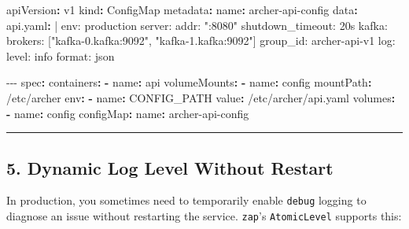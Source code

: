 \documentclass[
]{article}
\newenvironment{Shaded}{}{}
\newcommand{\AttributeTok}[1]{\textcolor[rgb]{0.49,0.56,0.16}{#1}}
\newcommand{\CharTok}[1]{\textcolor[rgb]{0.25,0.44,0.63}{#1}}
\newcommand{\FunctionTok}[1]{\textcolor[rgb]{0.02,0.16,0.49}{#1}}
\newcommand{\KeywordTok}[1]{\textcolor[rgb]{0.00,0.44,0.13}{\textbf{#1}}}
\newcommand{\NormalTok}[1]{#1}
\newcommand{\PreprocessorTok}[1]{\textcolor[rgb]{0.74,0.48,0.00}{#1}}
\begin{document}
\begin{Shaded}
\begin{Highlighting}[]
\FunctionTok{apiVersion}\KeywordTok{:}\AttributeTok{ v1}
\FunctionTok{kind}\KeywordTok{:}\AttributeTok{ ConfigMap}
\FunctionTok{metadata}\KeywordTok{:}
\AttributeTok{  }\FunctionTok{name}\KeywordTok{:}\AttributeTok{ archer{-}api{-}config}
\FunctionTok{data}\KeywordTok{:}
\FunctionTok{  api.yaml}\KeywordTok{: }\CharTok{|}
\NormalTok{    env: production}
\NormalTok{    server:}
\NormalTok{      addr: ":8080"}
\NormalTok{      shutdown\_timeout: 20s}
\NormalTok{    kafka:}
\NormalTok{      brokers: ["kafka{-}0.kafka:9092", "kafka{-}1.kafka:9092"]}
\NormalTok{      group\_id: archer{-}api{-}v1}
\NormalTok{    log:}
\NormalTok{      level: info}
\NormalTok{      format: json}

\PreprocessorTok{{-}{-}{-}}
\FunctionTok{spec}\KeywordTok{:}
\AttributeTok{  }\FunctionTok{containers}\KeywordTok{:}
\AttributeTok{  }\KeywordTok{{-}}\AttributeTok{ }\FunctionTok{name}\KeywordTok{:}\AttributeTok{ api}
\AttributeTok{    }\FunctionTok{volumeMounts}\KeywordTok{:}
\AttributeTok{    }\KeywordTok{{-}}\AttributeTok{ }\FunctionTok{name}\KeywordTok{:}\AttributeTok{ config}
\AttributeTok{      }\FunctionTok{mountPath}\KeywordTok{:}\AttributeTok{ /etc/archer}
\AttributeTok{    }\FunctionTok{env}\KeywordTok{:}
\AttributeTok{    }\KeywordTok{{-}}\AttributeTok{ }\FunctionTok{name}\KeywordTok{:}\AttributeTok{ CONFIG\_PATH}
\AttributeTok{      }\FunctionTok{value}\KeywordTok{:}\AttributeTok{ /etc/archer/api.yaml}
\AttributeTok{  }\FunctionTok{volumes}\KeywordTok{:}
\AttributeTok{  }\KeywordTok{{-}}\AttributeTok{ }\FunctionTok{name}\KeywordTok{:}\AttributeTok{ config}
\AttributeTok{    }\FunctionTok{configMap}\KeywordTok{:}
\AttributeTok{      }\FunctionTok{name}\KeywordTok{:}\AttributeTok{ archer{-}api{-}config}
\end{Highlighting}
\end{Shaded}

\begin{center}\rule{0.5\linewidth}{0.5pt}\end{center}

\hypertarget{dynamic-log-level-without-restart}{%
\subsection{5. Dynamic Log Level Without
Restart}\label{dynamic-log-level-without-restart}}

In production, you sometimes need to temporarily enable \texttt{debug}
logging to diagnose an issue without restarting the service.
\texttt{zap}'s \texttt{AtomicLevel} supports this:
\end{document}
